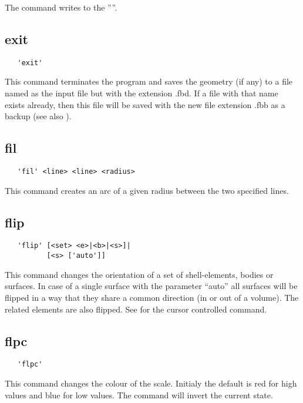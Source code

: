 \documentclass{article}
\begin{document}
The command writes to the ''''.

\subsection{\label{exit}exit}
\begin{verbatim}
   'exit' 
\end{verbatim}
This command terminates the program and saves the geometry (if any) to a file named as the input file but with the extension .fbd. If a file with that name exists already, then this file will be saved with the new file extension .fbb as a backup (see also ).

\subsection{\label{fil}fil}
\begin{verbatim}
   'fil' <line> <line> <radius>
\end{verbatim}
This command creates an arc of a given radius between the two specified lines.

\subsection{\label{flip}flip}
\begin{verbatim}
   'flip' [<set> <e>|<b>|<s>]|
          [<s> ['auto']]

\end{verbatim}
This command changes the orientation of a set of shell-elements, bodies or surfaces. In case of a single surface with the parameter ``auto'' all surfaces will be flipped in a way that they share a common direction (in or out of a volume). The related elements are also flipped. See  for the cursor controlled command.

\subsection{\label{flpc}flpc}
\begin{verbatim}
   'flpc'
\end{verbatim}
This command changes the colour of the scale. Initialy the default is red for high values and blue for low values. The command will invert the current state.
\end{document}
